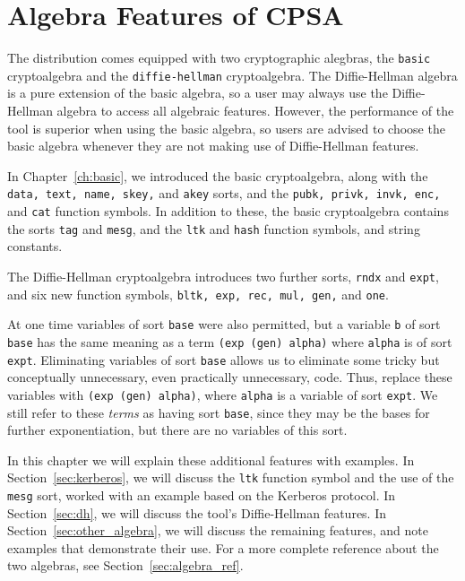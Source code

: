 \chapter{Algebra Features of CPSA}
\label{ch:algebra}

The {\cpsa} distribution comes equipped with two cryptographic
alegbras, the \texttt{basic} cryptoalgebra and the
\texttt{diffie-hellman} cryptoalgebra.  The Diffie-Hellman algebra is
a pure extension of the basic algebra, so a user may always use the
Diffie-Hellman algebra to access all algebraic features.  However, the
performance of the tool is superior when using the basic algebra, so
users are advised to choose the basic algebra whenever they are not
making use of Diffie-Hellman features.

In Chapter~\ref{ch:basic}, we introduced the basic cryptoalgebra,
along with the \texttt{data, text, name, skey,} and \texttt{akey}
sorts, and the \texttt{pubk, privk, invk, enc,} and \texttt{cat}
function symbols.  In addition to these, the basic cryptoalgebra
contains the sorts  \texttt{tag} and \texttt{mesg}, and
the \texttt{ltk} and \texttt{hash} function symbols, and string
constants.

The Diffie-Hellman cryptoalgebra introduces two further sorts,
\texttt{rndx} and \texttt{expt}, and six new function symbols,
\texttt{bltk, exp, rec, mul, gen,} and \texttt{one}.

At one time variables of sort \texttt{base} were also permitted, but a
variable \texttt{b} of sort \texttt{base} has the same meaning as a
term \texttt{(exp (gen) alpha)} where \texttt{alpha} is of sort
\texttt{expt}.  Eliminating variables of sort \texttt{base} allows us
to eliminate some tricky but conceptually unnecessary, even
practically unnecessary, code.  Thus, replace these variables with
\texttt{(exp (gen) alpha)}, where \texttt{alpha} is a variable of sort
\texttt{expt}.  We still refer to these \emph{terms} as having sort
\texttt{base}, since they may be the bases for further exponentiation,
but there are no variables of this sort.

In this chapter we will explain these additional features with
examples.  In Section~\ref{sec:kerberos}, we will discuss the
\texttt{ltk} function symbol and the use of the \texttt{mesg} sort,
worked with an example based on the Kerberos protocol.  In
Section~\ref{sec:dh}, we will discuss the tool's Diffie-Hellman
features.  In Section~\ref{sec:other_algebra}, we will discuss the
remaining features, and note examples that demonstrate their use.
For a more complete reference about the two algebras, see Section~\ref{sec:algebra_ref}.

